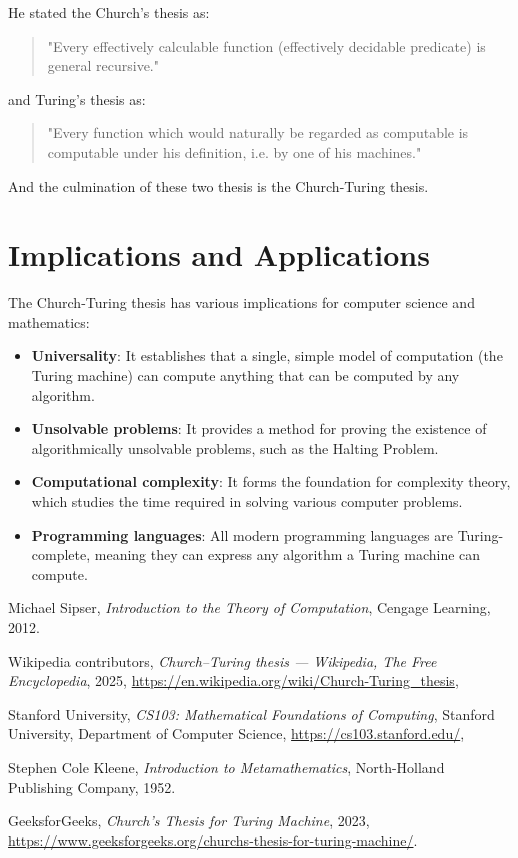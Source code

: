 \documentclass{article}
\begin{document}
  He stated the Church's thesis as:
  \begin{quote}
    "Every effectively calculable function (effectively decidable predicate) is general recursive."
  \end{quote}

  and Turing's thesis as:
  \begin{quote}
    "Every function which would naturally be regarded as computable is computable under his definition, i.e. by one of his machines."
  \end{quote}

  And the culmination of these two thesis is the Church-Turing thesis.

\section{Implications and Applications}
The Church-Turing thesis has various implications for computer science and mathematics:

\begin{itemize}
  \item \textbf{Universality}: It establishes that a single, simple model of computation (the Turing machine) can compute anything that can be computed by any algorithm.
  
  \item \textbf{Unsolvable problems}: It provides a method for proving the existence of algorithmically unsolvable problems, such as the Halting Problem.
  
  \item \textbf{Computational complexity}: It forms the foundation for complexity theory, which studies the time required in solving various computer problems.
  
  \item \textbf{Programming languages}: All modern programming languages are Turing-complete, meaning they can express any algorithm a Turing machine can compute.
\end{itemize}

\begin{thebibliography}{9}
Michael Sipser,
\textit{Introduction to the Theory of Computation},
Cengage Learning, 2012.

Wikipedia contributors,
\textit{Church–Turing thesis --- Wikipedia, The Free Encyclopedia},
2025,
\url{https://en.wikipedia.org/wiki/Church-Turing_thesis},

Stanford University,
\textit{CS103: Mathematical Foundations of Computing},
Stanford University, Department of Computer Science,
\url{https://cs103.stanford.edu/},

Stephen Cole Kleene,
\textit{Introduction to Metamathematics},
North-Holland Publishing Company, 1952.

GeeksforGeeks,
\textit{Church's Thesis for Turing Machine},
2023,
\url{https://www.geeksforgeeks.org/churchs-thesis-for-turing-machine/}.


\end{thebibliography}
\end{document}
